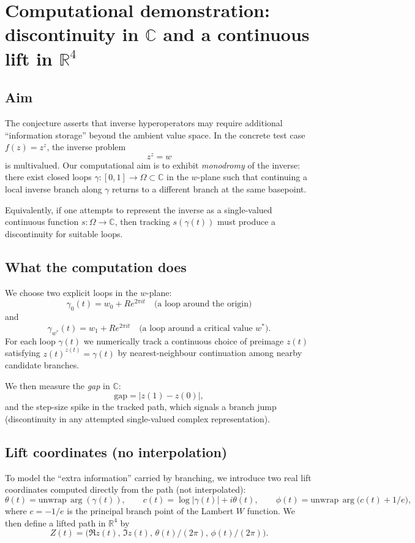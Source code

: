 \section{Computational demonstration: discontinuity in $\mathbb{C}$ and a continuous lift in $\mathbb{R}^4$}

\subsection{Aim}
The conjecture asserts that inverse hyperoperators may require additional
``information storage'' beyond the ambient value space. In the concrete
test case $f(z)=z^z$, the inverse problem
\[
z^z = w
\]
is multivalued. Our computational aim is to exhibit \emph{monodromy} of the inverse:
there exist closed loops $\gamma:[0,1]\to\Omega\subset\mathbb{C}$ in the $w$-plane
such that continuing a local inverse branch along $\gamma$ returns to a different
branch at the same basepoint.

Equivalently, if one attempts to represent the inverse as a single-valued
continuous function $s:\Omega\to\mathbb{C}$, then tracking $s(\gamma(t))$ must
produce a discontinuity for suitable loops.

\subsection{What the computation does}
We choose two explicit loops in the $w$-plane:
\[
\gamma_{0}(t) = w_0 + R e^{2\pi i t} \quad \text{(a loop around the origin)}
\]
and
\[
\gamma_{w^\ast}(t) = w_1 + R e^{2\pi i t} \quad \text{(a loop around a critical value $w^\ast$).}
\]
For each loop $\gamma(t)$ we numerically track a continuous choice of preimage
$z(t)$ satisfying $z(t)^{z(t)} = \gamma(t)$ by nearest-neighbour continuation
among nearby candidate branches.

We then measure the \emph{gap} in $\mathbb{C}$:
\[
\mathrm{gap} = |z(1)-z(0)|,
\]
and the step-size spike in the tracked path, which signals a branch jump
(discontinuity in any attempted single-valued complex representation).

\subsection{Lift coordinates (no interpolation)}
To model the ``extra information'' carried by branching, we introduce two
real lift coordinates computed directly from the path (not interpolated):
\[
\theta(t) = \mathrm{unwrap}\,\arg(\gamma(t)),
\qquad
c(t) = \log|\gamma(t)| + i\theta(t),
\qquad
\phi(t) = \mathrm{unwrap}\,\arg\big(c(t)+1/e\big),
\]
where $c=-1/e$ is the principal branch point of the Lambert $W$ function.
We then define a lifted path in $\mathbb{R}^4$ by
\[
Z(t) = \big(\Re z(t),\, \Im z(t),\, \theta(t)/(2\pi),\, \phi(t)/(2\pi)\big).
\]

